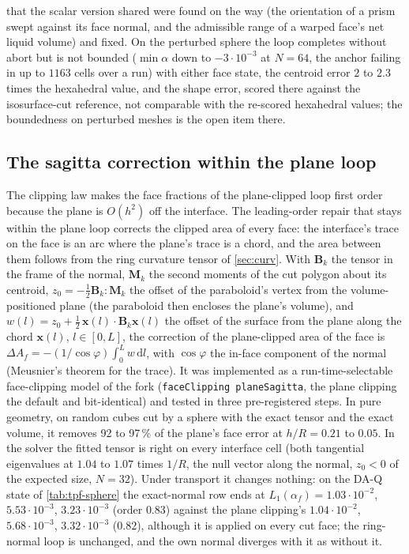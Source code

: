 \documentclass[preprint,12pt]{elsarticle}
\begin{document}
that the scalar version shared were found on the way (the orientation of a prism swept against its face normal, and the admissible range of a warped face's net liquid volume) and fixed. On the perturbed sphere the loop completes without abort but is not bounded ($\min\alpha$ down to $-3\cdot10^{-3}$ at $N = 64$, the anchor failing in up to $1163$ cells over a run) with either face state, the centroid error $2$ to $2.3$ times the hexahedral value, and the shape error, scored there against the isosurface-cut reference, not comparable with the re-scored hexahedral values; the boundedness on perturbed meshes is the open item there.

\subsection{The sagitta correction within the plane loop}
\label{app:tpf-sagitta}

The clipping law makes the face fractions of the plane-clipped loop first order because the plane is $O(h^2)$ off the interface. The leading-order repair that stays within the plane loop corrects the clipped area of every face: the interface's trace on the face is an arc where the plane's trace is a chord, and the area between them follows from the ring curvature tensor of \cref{sec:curv}. With $\mathbf{B}_k$ the tensor in the frame of the normal, $\mathbf{M}_k$ the second moments of the cut polygon about its centroid, $z_0 = -\tfrac12 \mathbf{B}_k : \mathbf{M}_k$ the offset of the paraboloid's vertex from the volume-positioned plane (the paraboloid then encloses the plane's volume), and $w(l) = z_0 + \tfrac12\, \mathbf{x}(l) \cdot \mathbf{B}_k \mathbf{x}(l)$ the offset of the surface from the plane along the chord $\mathbf{x}(l)$, $l \in [0, L]$, the correction of the plane-clipped area of the face is $\Delta A_f = -(1/\cos\varphi) \int_0^L w \, \mathrm{d}l$, with $\cos\varphi$ the in-face component of the normal (Meusnier's theorem for the trace). It was implemented as a run-time-selectable face-clipping model of the fork (\texttt{faceClipping planeSagitta}, the plane clipping the default and bit-identical) and tested in three pre-registered steps. In pure geometry, on random cubes cut by a sphere with the exact tensor and the exact volume, it removes 92 to 97\,\% of the plane's face error at $h/R = 0.21$ to $0.05$. In the solver the fitted tensor is right on every interface cell (both tangential eigenvalues at $1.04$ to $1.07$ times $1/R$, the null vector along the normal, $z_0 < 0$ of the expected size, $N = 32$). Under transport it changes nothing: on the DA-Q state of \cref{tab:tpf-sphere} the exact-normal row ends at $L_1(\alpha_f) = 1.03\cdot10^{-2}$, $5.53\cdot10^{-3}$, $3.23\cdot10^{-3}$ (order $0.83$) against the plane clipping's $1.04\cdot10^{-2}$, $5.68\cdot10^{-3}$, $3.32\cdot10^{-3}$ ($0.82$), although it is applied on every cut face; the ring-normal loop is unchanged, and the own normal diverges with it as without it.
\end{document}
